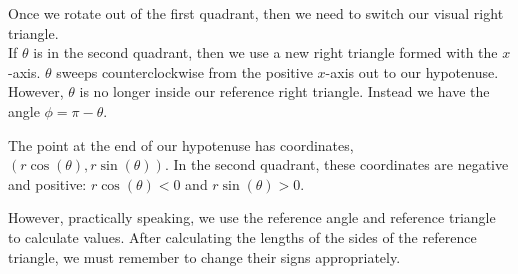\documentclass{ximera}
\begin{document}
\begin{image}
\end{image}




Once we rotate out of the first quadrant, then we need to switch our visual right triangle. \\


If $\theta$ is in the second quadrant, then we use a new right triangle formed with the $x$-axis. $\theta$ sweeps counterclockwise from the positive $x$-axis out to our hypotenuse. However, $\theta$ is no longer inside our reference right triangle.  Instead we have the angle $\phi = \pi - \theta$.  

The point at the end of our hypotenuse has coordinates, $(r \cos(\theta), r \sin(\theta))$.  In the second quadrant, these coordinates are negative and positive: $r \cos(\theta) < 0$ and $r \sin(\theta) > 0$.

However, practically speaking, we use the reference angle and reference triangle to calculate values.  After calculating the lengths of the sides of the reference triangle, we must remember to change their signs appropriately. 
\end{document}
